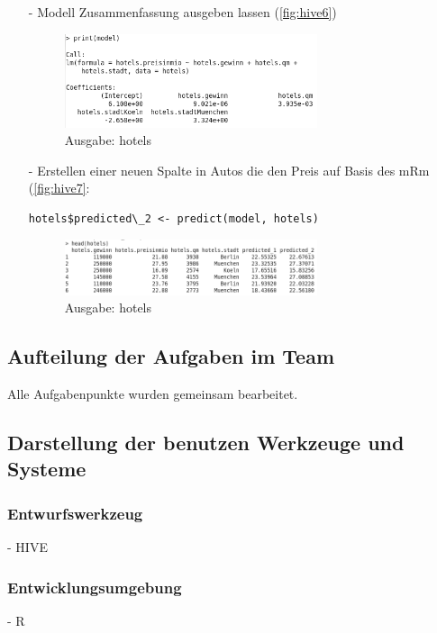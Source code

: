 \begin{itemize}
\item[-] Modell Zusammenfassung ausgeben lassen (\autoref{fig:hive6})
\begin{figure}[!htb]
        \begin{minipage}{1\textwidth}
                \centering
                \includegraphics[width=0.70\textwidth]{pics/Hotels_model_2.png}\par\vspace{0cm}
                \caption{Ausgabe: hotels}
                \label{fig:hive6}
        \end{minipage}
\end{figure}
\item[-] Erstellen einer neuen Spalte in Autos die den Preis auf Basis des mRm (\autoref{fig:hive7}: 
\begin{lstlisting}
hotels$predicted\_2 <- predict(model, hotels)
\end{lstlisting}
\begin{figure}[!htb]
        \begin{minipage}{1\textwidth}
                \centering
                \includegraphics[width=0.70\textwidth]{pics/hotels_head.png}\par\vspace{0cm}
                \caption{Ausgabe: hotels}
                \label{fig:hive7}
        \end{minipage}
\end{figure}
\end{itemize}

\subsection*{Aufteilung der Aufgaben im Team}
Alle Aufgabenpunkte wurden gemeinsam bearbeitet.
\subsection*{Darstellung der benutzen Werkzeuge und Systeme}
\subsubsection*{Entwurfswerkzeug}
- HIVE 

\subsubsection*{Entwicklungsumgebung}
- R

